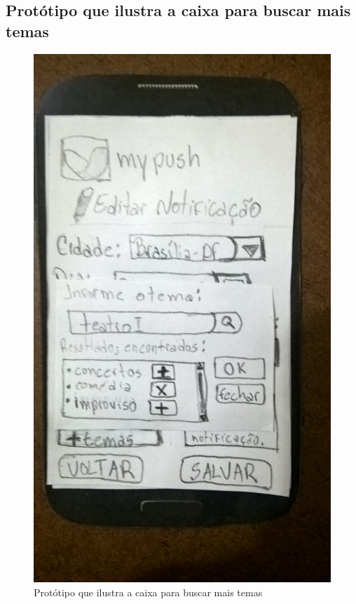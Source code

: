 \begin{apendicesenv}
  \pagebreak
  \section*{Protótipo que ilustra a caixa para buscar mais temas}

    \begin{figure}[!htbp]
      \centering
      \includegraphics[scale=0.32, angle=-90]{editaveis/figuras/prototipo_papel_v2/editar_notificacao_mais_temas}
      \caption{Protótipo que ilustra a caixa para buscar mais temas}
      \label{editar_notificacao_mais_temas_v2}
    \end{figure}
  

\end{apendicesenv}
